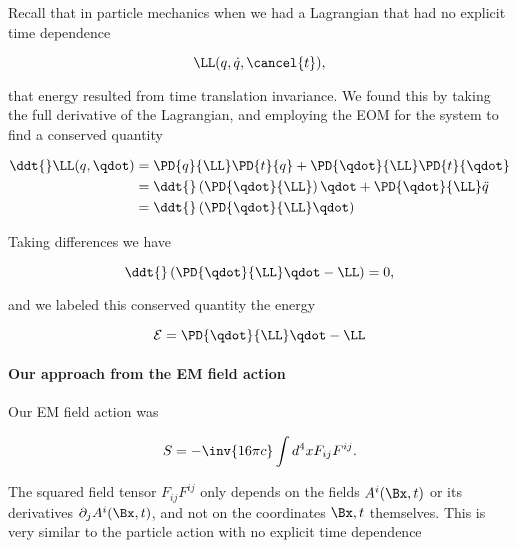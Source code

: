 Recall that in particle mechanics when we had a Lagrangian that had no explicit time dependence

\begin{equation}\label{eqn:relativisticElectrodynamicsL21b:380}
\LL(q, \dot{q}, \cancel{t}),
\end{equation}

that energy resulted from time translation invariance.  We found this by taking the full derivative of the Lagrangian, and employing the EOM for the system to find a conserved quantity

\begin{equation}\label{eqn:relativisticElectrodynamicsL21b:560}
\begin{aligned}
\ddt{} \LL(q, \qdot) 
&=
\PD{q}{\LL} \PD{t}{q}
+\PD{\qdot}{\LL} \PD{t}{\qdot} \\
&=
\ddt{} \left( \PD{\qdot}{\LL} \right) \qdot
+\PD{\qdot}{\LL} \ddot{q} \\
&=
\ddt{} \left( \PD{\qdot}{\LL} \qdot \right) 
\end{aligned}
\end{equation}

Taking differences we have

\begin{equation}\label{eqn:relativisticElectrodynamicsL21b:400}
\ddt{} \left( \PD{\qdot}{\LL} \qdot -\LL \right) = 0,
\end{equation}

and we labeled this conserved quantity the energy

\begin{equation}\label{eqn:relativisticElectrodynamicsL21b:420}
\mathcal{E} = \PD{\qdot}{\LL} \qdot -\LL 
\end{equation}

\paragraph{Our approach from the EM field action}

Our EM field action was

\begin{equation}\label{eqn:relativisticElectrodynamicsL21b:500}
S = -\inv{16 \pi c} \int d^4 x F_{i j} F^{i j}.
\end{equation}

The squared field tensor \(F_{i j} F^{i j}\) only depends on the fields \(A^i(\Bx, t)\) or its derivatives \(\partial_j A^i(\Bx, t)\), and not on the coordinates \(\Bx, t\) themselves.  This is very similar to the particle action with no explicit time dependence

